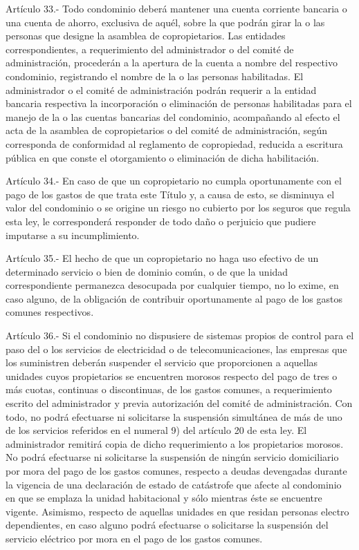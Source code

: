     Artículo 33.- Todo condominio deberá mantener una cuenta corriente bancaria o una cuenta de ahorro, exclusiva de aquél, sobre la que podrán girar la o las personas que designe la asamblea de copropietarios. Las entidades correspondientes, a requerimiento del administrador o del comité de administración, procederán a la apertura de la cuenta a nombre del respectivo condominio, registrando el nombre de la o las personas habilitadas.
    El administrador o el comité de administración podrán requerir a la entidad bancaria respectiva la incorporación o eliminación de personas habilitadas para el manejo de la o las cuentas bancarias del condominio, acompañando al efecto el acta de la asamblea de copropietarios o del comité de administración, según corresponda de conformidad al reglamento de copropiedad, reducida a escritura pública en que conste el otorgamiento o eliminación de dicha habilitación.
     
    Artículo 34.- En caso de que un copropietario no cumpla oportunamente con el pago de los gastos de que trata este Título y, a causa de esto, se disminuya el valor del condominio o se origine un riesgo no cubierto por los seguros que regula esta ley, le corresponderá responder de todo daño o perjuicio que pudiere imputarse a su incumplimiento.
     
    Artículo 35.- El hecho de que un copropietario no haga uso efectivo de un determinado servicio o bien de dominio común, o de que la unidad correspondiente permanezca desocupada por cualquier tiempo, no lo exime, en caso alguno, de la obligación de contribuir oportunamente al pago de los gastos comunes respectivos.
     
    Artículo 36.- Si el condominio no dispusiere de sistemas propios de control para el paso del o los servicios de electricidad o de telecomunicaciones, las empresas que los suministren deberán suspender el servicio que proporcionen a aquellas unidades cuyos propietarios se encuentren morosos respecto del pago de tres o más cuotas, continuas o discontinuas, de los gastos comunes, a requerimiento escrito del administrador y previa autorización del comité de administración. Con todo, no podrá efectuarse ni solicitarse la suspensión simultánea de más de uno de los servicios referidos en el numeral 9) del artículo 20 de esta ley. El administrador remitirá copia de dicho requerimiento a los propietarios morosos.
    No podrá efectuarse ni solicitarse la suspensión de ningún servicio domiciliario por mora del pago de los gastos comunes, respecto a deudas devengadas durante la vigencia de una declaración de estado de catástrofe que afecte al condominio en que se emplaza la unidad habitacional y sólo mientras éste se encuentre vigente.
    Asimismo, respecto de aquellas unidades en que residan personas electro dependientes, en caso alguno podrá efectuarse o solicitarse la suspensión del servicio eléctrico por mora en el pago de los gastos comunes.
   
